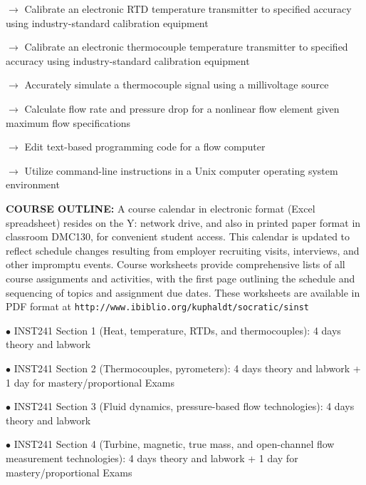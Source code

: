 \item\item{$\rightarrow$} Calibrate an electronic RTD temperature transmitter to specified accuracy using industry-standard calibration equipment
\item\item{$\rightarrow$} Calibrate an electronic thermocouple temperature transmitter to specified accuracy using industry-standard calibration equipment
\item\item{$\rightarrow$} Accurately simulate a thermocouple signal using a millivoltage source
\item\item{$\rightarrow$} Calculate flow rate and pressure drop for a nonlinear flow element given maximum flow specifications
\item\item{$\rightarrow$} Edit text-based programming code for a flow computer
\item\item{$\rightarrow$} Utilize command-line instructions in a Unix computer operating system environment


\vskip 10pt

\noindent
{\bf COURSE OUTLINE:} A course calendar in electronic format (Excel spreadsheet) resides on the Y: network drive, and also in printed paper format in classroom DMC130, for convenient student access.  This calendar is updated to reflect schedule changes resulting from employer recruiting visits, interviews, and other impromptu events.  Course worksheets provide comprehensive lists of all course assignments and activities, with the first page outlining the schedule and sequencing of topics and assignment due dates.  These worksheets are available in PDF format at {\tt http://www.ibiblio.org/kuphaldt/socratic/sinst}

\vskip 5pt

\item{$\bullet$} INST241 Section 1 (Heat, temperature, RTDs, and thermocouples): 4 days theory and labwork
\item{$\bullet$} INST241 Section 2 (Thermocouples, pyrometers): 4 days theory and labwork + 1 day for mastery/proportional Exams
\item{$\bullet$} INST241 Section 3 (Fluid dynamics, pressure-based flow technologies): 4 days theory and labwork
\item{$\bullet$} INST241 Section 4 (Turbine, magnetic, true mass, and open-channel flow measurement technologies): 4 days theory and labwork + 1 day for mastery/proportional Exams

